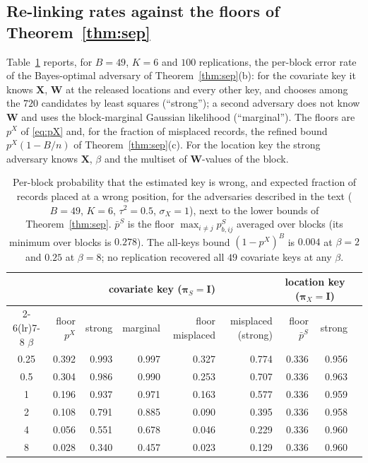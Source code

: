 \documentclass[11pt]{article}
\theoremstyle{definition}
\newcommand{\bX}{\mathbf{X}}
\newcommand{\bW}{\mathbf{W}}
\newcommand{\bI}{\mathbf{I}}
\newcommand{\bpi}{\boldsymbol{\pi}}
\begin{document}
\subsection{Re-linking rates against the floors of Theorem~\ref{thm:sep}}
Table~\ref{tab:relink} reports, for $B=49$, $K=6$ and $100$ replications, the per-block error rate of the Bayes-optimal adversary of Theorem~\ref{thm:sep}(b): for the covariate key it knows $\bX$, $\bW$ at the released locations and every other key, and chooses among the $720$ candidates by least squares (``strong''); a second adversary does not know $\bW$ and uses the block-marginal Gaussian likelihood (``marginal''). The floors are $p^X$ of \eqref{eq:pX} and, for the fraction of misplaced records, the refined bound $p^X(1-B/n)$ of Theorem~\ref{thm:sep}(c). For the location key the strong adversary knows $\bX$, $\beta$ and the multiset of $\bW$-values of the block.

\begin{table}[t]\centering\small
\begin{tabular}{crrrrrrrr}\toprule
 & \multicolumn{5}{c}{covariate key ($\bpi_S=\bI$)} & \multicolumn{2}{c}{location key ($\bpi_X=\bI$)}\\
\cmidrule(lr){2-6}\cmidrule(lr){7-8}
$\beta$ & floor $p^X$ & strong & marginal & floor misplaced & misplaced (strong) & floor $\bar p^S$ & strong\\\midrule
0.25 & 0.392 & 0.993 & 0.997 & 0.327 & 0.774 & 0.336 & 0.956\\
0.5  & 0.304 & 0.986 & 0.990 & 0.253 & 0.707 & 0.336 & 0.963\\
1    & 0.196 & 0.937 & 0.971 & 0.163 & 0.577 & 0.336 & 0.959\\
2    & 0.108 & 0.791 & 0.885 & 0.090 & 0.395 & 0.336 & 0.958\\
4    & 0.056 & 0.551 & 0.678 & 0.046 & 0.229 & 0.336 & 0.960\\
8    & 0.028 & 0.340 & 0.457 & 0.023 & 0.129 & 0.336 & 0.960\\\bottomrule
\end{tabular}
\caption{Per-block probability that the estimated key is wrong, and expected fraction of records placed at a wrong position, for the adversaries described in the text ($B=49$, $K=6$, $\tau^2=0.5$, $\sigma_X=1$), next to the lower bounds of Theorem~\ref{thm:sep}. $\bar p^S$ is the floor $\max_{i\ne j}p^S_{b,ij}$ averaged over blocks (its minimum over blocks is $0.278$). The all-keys bound $(1-p^X)^B$ is $0.004$ at $\beta=2$ and $0.25$ at $\beta=8$; no replication recovered all $49$ covariate keys at any $\beta$.}
\label{tab:relink}
\end{table}
\end{document}

